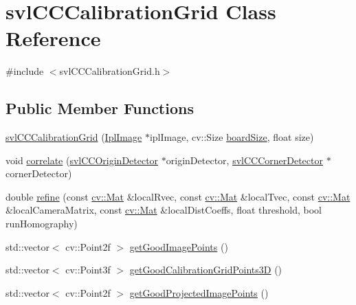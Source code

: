 \hypertarget{classsvl_c_c_calibration_grid}{\section{svl\-C\-C\-Calibration\-Grid Class Reference}
\label{classsvl_c_c_calibration_grid}
}


{\ttfamily \#include $<$svl\-C\-C\-Calibration\-Grid.\-h$>$}

\subsection*{Public Member Functions}
\begin{DoxyCompactItemize}
\item 
\hyperlink{classsvl_c_c_calibration_grid_a30f35f3fa081d9aef26ddd14ea7768a4}{svl\-C\-C\-Calibration\-Grid} (\hyperlink{svl_types_8h_aa5a40a13021ba9708bfe921e18fdfa53}{Ipl\-Image} $\ast$ipl\-Image, cv\-::\-Size \hyperlink{classsvl_c_c_calibration_grid_a0c584283648c8d63a0c33646d35a60f2}{board\-Size}, float size)
\item 
void \hyperlink{classsvl_c_c_calibration_grid_a751a80c36e0d1d094a41cb8204b0658e}{correlate} (\hyperlink{classsvl_c_c_origin_detector}{svl\-C\-C\-Origin\-Detector} $\ast$origin\-Detector, \hyperlink{classsvl_c_c_corner_detector}{svl\-C\-C\-Corner\-Detector} $\ast$corner\-Detector)
\item 
double \hyperlink{classsvl_c_c_calibration_grid_a4f0a7daef69595eed5cf2b23eb94132f}{refine} (const \hyperlink{namespacecv_a60d81b54f4914bec4cc4a72ab77eb444}{cv\-::\-Mat} \&local\-Rvec, const \hyperlink{namespacecv_a60d81b54f4914bec4cc4a72ab77eb444}{cv\-::\-Mat} \&local\-Tvec, const \hyperlink{namespacecv_a60d81b54f4914bec4cc4a72ab77eb444}{cv\-::\-Mat} \&local\-Camera\-Matrix, const \hyperlink{namespacecv_a60d81b54f4914bec4cc4a72ab77eb444}{cv\-::\-Mat} \&local\-Dist\-Coeffs, float threshold, bool run\-Homography)
\item 
std\-::vector$<$ cv\-::\-Point2f $>$ \hyperlink{classsvl_c_c_calibration_grid_a752883125648639e89eb05d66d19a5d4}{get\-Good\-Image\-Points} ()
\item 
std\-::vector$<$ cv\-::\-Point3f $>$ \hyperlink{classsvl_c_c_calibration_grid_a32c98cacf6d5961cfce2cef58fa03586}{get\-Good\-Calibration\-Grid\-Points3\-D} ()
\item 
std\-::vector$<$ cv\-::\-Point2f $>$ \hyperlink{classsvl_c_c_calibration_grid_aeea914d2140f4cbb5064272ce3d82ab0}{get\-Good\-Projected\-Image\-Points} ()

\end{DoxyCompactItemize}
